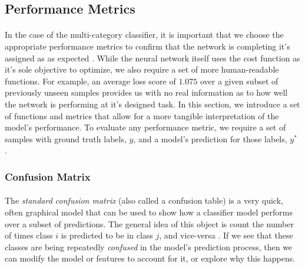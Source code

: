 \documentclass[12pt,letterpaper]{article}
\begin{document}

\subsection{Performance Metrics}

\paragraph*{}In the case of the multi-category classifier, it is important that we choose the appropriate performance metrics to confirm that the network is completing it's assigned as as expected \cite{Geron}. While the neural network itself uses the cost function as it's sole objective to optimize, we also require a set of more human-readable functions. For example, an average loss score of $1.075$ over a given subset of previously unseen samples provides us with no real information as to how well the network is performing at it's designed task. In this section, we introduce a set of functions and metrics that allow for a more tangible interpretation of the model's performance. To evaluate any performance metric, we require a set of samples with ground truth labels, $y$, and a model's prediction for those labels, $y^*$ \cite{Goodfellow,James}.


\subsubsection{Confusion Matrix}

\paragraph*{}The \textit{standard confusion matrix} (also called a confusion table) is a very quick, often graphical model that can be used to show how a classifier model performs over a subset of predictions. The general idea of this object is count the number of times class $i$ is predicted to be in class $j$, and vice-versa \cite{Geron}. If we see that these classes are being repeatedly \textit{confused} in the model's prediction process, then we can modify the model or features to account for it, or explore why this happens.
\end{document}
